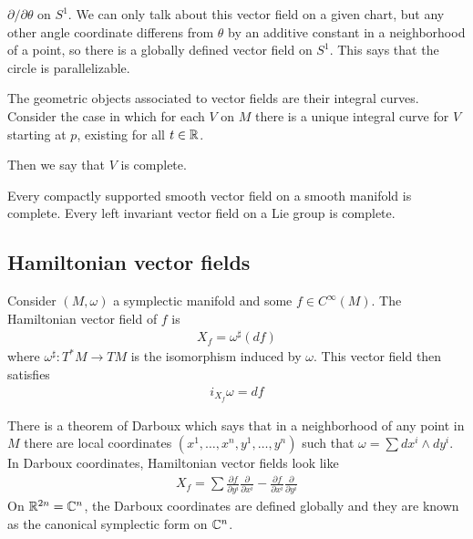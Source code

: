 \documentclass[12pt]{article}
\begin{document}
\begin{example}
	$\partial/\partial \theta$ on $S^1$. We can only talk about this vector field on a given chart, but
	any other angle coordinate differens from $\theta$ by an additive constant in a neighborhood of a point,
	so there is a globally defined vector field on $S^1$. This says that the circle is parallelizable.
\end{example}

\hfill

The geometric objects associated to vector fields are their integral curves. Consider the case
in which for each $V$ on $M$ there is a unique integral curve for $V$ starting at $p$, existing for all $t\in \mathbb{R}$.

\hfill

Then we say that $V$ is complete.
\begin{example}
	Every compactly supported smooth vector field on a smooth manifold is complete.
	Every left invariant vector field on a Lie group is complete.
\end{example}

\subsection{Hamiltonian vector fields}
Consider $(M,\omega)$ a symplectic manifold and some $f\in C^\infty(M)$.
The Hamiltonian vector field of $f$ is \begin{align*}
	X_f = \omega^\sharp(df)
\end{align*} where $\omega^\sharp:T^*M\to TM$ is the isomorphism induced by $\omega$. This vector field
then satisfies \begin{align*}
	i_{X_f}\omega = df
\end{align*}

\begin{example}
	There is a theorem of Darboux which says that in a neighborhood of any point in $M$ there are
	local coordinates $(x^1,\dots,x^n,y^1,\dots,y^n)$ such that $\omega = \sum dx^i\wedge dy^i$.
	In Darboux coordinates, Hamiltonian vector fields look like \begin{align*}
		X_f = \sum \frac{\partial f}{\partial y^i}\frac{\partial}{\partial x^i} - \frac{\partial f}{\partial x^i}\frac{\partial}{\partial y^i}
	\end{align*}
	On $\mathbb{R}^{2n} = \mathbb{C}^n$, the Darboux coordinates are defined globally and
	they are known as the canonical symplectic form on $\mathbb{C}^n$.
\end{example}
\end{document}
